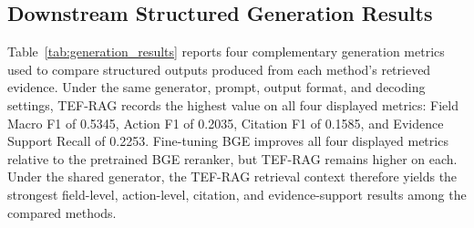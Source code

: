 \subsection{Downstream Structured Generation Results}
\label{sec:generation_results}

Table~\ref{tab:generation_results} reports four complementary generation metrics used to compare structured outputs produced from each method's retrieved evidence. Under the same generator, prompt, output format, and decoding settings, TEF-RAG records the highest value on all four displayed metrics: Field Macro F1 of 0.5345, Action F1 of 0.2035, Citation F1 of 0.1585, and Evidence Support Recall of 0.2253. Fine-tuning BGE improves all four displayed metrics relative to the pretrained BGE reranker, but TEF-RAG remains higher on each. Under the shared generator, the TEF-RAG retrieval context therefore yields the strongest field-level, action-level, citation, and evidence-support results among the compared methods.

\begin{table}[t]
\caption{Primary structured-generation metrics on the generation test set.}
\label{tab:generation_results}
\centering
\small
\setlength{\tabcolsep}{3pt}
\end{table}

